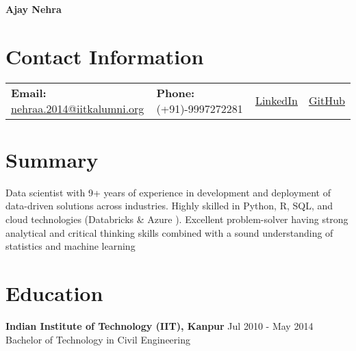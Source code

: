 \documentclass[a4paper,10pt]{article}
\begin{document}
\begin{center}
    \textbf{\huge Ajay Nehra}
\end{center}

%

\section*{Contact Information}
\noindent
\begin{tabular*}{\linewidth}{@{\extracolsep{\fill}}lllr@{}}
    \textbf{Email:} \href{mailto:nehraa.2014@iitkalumni.org}{nehraa.2014@iitkalumni.org} &
    \textbf{Phone:} (+91)-9997272281 &
    \href{https://www.linkedin.com/in/ajay-n-575bba23/}{\textcolor[RGB]{10,102,194}{\underline{LinkedIn}}} &
    \href{https://github.com/ajaynehra}{\textcolor[RGB]{17,15,15}{\underline{GitHub}}}
\end{tabular*}





\section*{Summary}
Data scientist with 9+ years of experience in development and deployment of data-driven solutions across industries. Highly skilled in Python, R, SQL, and cloud technologies (Databricks \& Azure ). Excellent problem-solver having strong analytical and critical thinking skills combined with a sound understanding of statistics and machine learning


\section*{Education}
\textbf{Indian Institute of Technology (IIT), Kanpur} \hfill \textnormal{Jul 2010 - May 2014} \\
Bachelor of Technology in Civil Engineering

\end{document}
